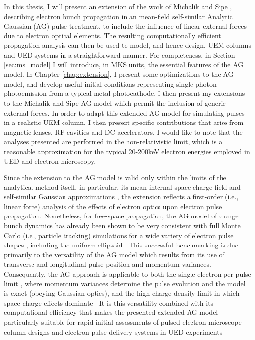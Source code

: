 In this thesis, I will present an extension of the work of Michalik and Sipe \cite{michalik_analytic_2006,michalik_erratum:_2008}, describing electron bunch propagation in an mean-field self-similar Analytic Gaussian (AG) pulse treatment, to include the influence of linear external forces due to electron optical elements.
The resulting computationally efficient propagation analysis can then be used to model, and hence design, UEM columns and UED systems in a straightforward manner.
For completeness, in Section \ref{sec:ms_model} I will introduce, in MKS units, the essential features of the AG model.
In Chapter \ref{chap:extension}, I present some optimizations to the AG model, and develop useful initial conditions representing single-photon photoemission from a typical metal photocathode.
I then present my extensions to the Michalik and Sipe AG model which permit the inclusion of generic external forces.
In order to adapt this extended AG model for simulating pulses in a realistic UEM column, I then present specific contributions that arise from magnetic lenses, RF cavities and DC accelerators.
I would like to note that the analyses presented are performed in the non-relativistic limit, which is a reasonable approximation for the typical 20-200keV electron energies employed in UED and electron microscopy.

Since the extension to the AG model is valid only within the limits of the analytical method itself, in particular, its mean internal space-charge field and self-similar Gaussian approximations \cite{michalik_analytic_2006}, the extension reflects a first-order (i.e., linear force) analysis of the effects of electron optics upon electron pulse propagation.
Nonetheless, for free-space propagation, the AG model of charge bunch dynamics has already been shown to be very consistent with full Monte Carlo (i.e., particle tracking) simulations for a wide variety of electron pulse shapes \cite{michalik_analytic_2006,michalik_evolution_2009}, including the uniform ellipsoid \cite{luiten_how_2004}.
This successful benchmarking is due primarily to the versatility of the AG model which results from its use of transverse and longitudinal pulse position and momentum variances.
Consequently, the AG approach is applicable to both the single electron per pulse limit \cite{lobastov_four-dimensional_2005}, where momentum variances determine the pulse evolution and the model is exact (obeying Gaussian optics), and the high charge density limit in which space-charge effects dominate \cite{luiten_how_2004,siwick_ultrafast_2002,cao_femtosecond_2003}.
It is this versatility combined with its computational efficiency that makes the presented extended AG model particularly suitable for rapid initial assessments of pulsed electron microscope column designs and electron pulse delivery systems in UED experiments.

